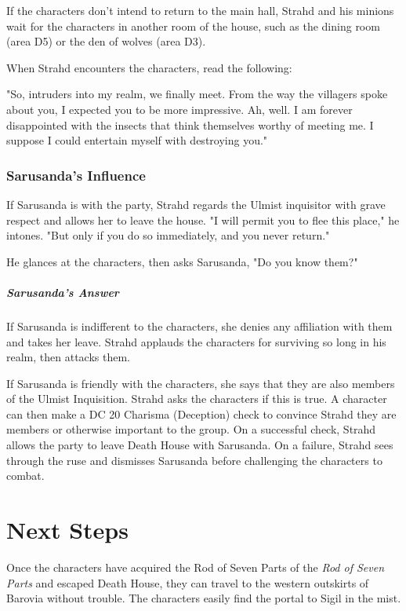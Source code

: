 \documentclass[10pt,a4paper,twoside,bg=print,twocolumn,openany,nodeprecatedcode]{dndbook}
\begin{document}
If the characters don't intend to return to the main hall, Strahd and his minions wait for the characters in another room of the house, such as the dining room (area D5) or the den of wolves (area D3).

When Strahd encounters the characters, read the following:

\begin{DndReadAloud}{}
"So, intruders into my realm, we finally meet. From the way the villagers spoke about you, I expected you to be more impressive. Ah, well. I am forever disappointed with the insects that think themselves worthy of meeting me. I suppose I could entertain myself with destroying you."

\end{DndReadAloud}

\subsubsection{Sarusanda's Influence}
If Sarusanda is with the party, Strahd regards the Ulmist inquisitor with grave respect and allows her to leave the house. "I will permit you to flee this place," he intones. "But only if you do so immediately, and you never return."

He glances at the characters, then asks Sarusanda, "Do you know them?"

\subparagraph{Sarusanda's Answer}
If Sarusanda is indifferent to the characters, she denies any affiliation with them and takes her leave. Strahd applauds the characters for surviving so long in his realm, then attacks them.

If Sarusanda is friendly with the characters, she says that they are also members of the Ulmist Inquisition. Strahd asks the characters if this is true. A character can then make a DC 20 Charisma (Deception) check to convince Strahd they are members or otherwise important to the group. On a successful check, Strahd allows the party to leave Death House with Sarusanda. On a failure, Strahd sees through the ruse and dismisses Sarusanda before challenging the characters to combat.

\section{Next Steps}
Once the characters have acquired the Rod of Seven Parts of the \textit{Rod of Seven Parts} and escaped Death House, they can travel to the western outskirts of Barovia without trouble. The characters easily find the portal to Sigil in the mist.
\end{document}
